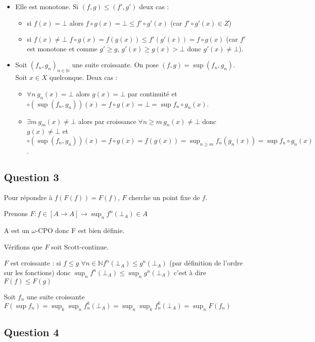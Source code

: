 \documentclass{article}
\newcommand{\N}{\mathbb{N}}
\newcommand{\oCPO}{$\omega$-CPO }
\begin{document}
\begin{itemize}
    \item Elle est monotone. Si $(f, g) \leq (f', g')$ deux cas :
    \begin{itemize}
        \item si $f(x) = \bot$ alors $f\circ g(x) = \bot \leq f'\circ g'(x)$ (car $f'\circ g'(x) \in Z$) 
        \item si $f(x) \neq \bot$ $f\circ g(x) = f(g(x)) \leq f'(g'(x)) = f\circ g(x)$ (car $f'$ est monotone et comme $g' \geq g$, $g'(x) \geq g(x) > \bot$ donc $g'(x) \neq \bot$).
    \end{itemize}
    \item Soit $(f_n, g_n)_{n \in \N}$ une suite croissante. On pose $(f, g) = \sup (f_n, g_n)$. Soit $x \in X$ quelconque. Deux cas :
    \begin{itemize}
        \item $\forall n \: g_n(x) = \bot$ alors $g(x) = \bot$ par continuité et $\circ(\sup (f_n, g_n))(x) = f\circ g(x) = \bot = \sup f_n\circ g_n(x)$.
        \item $\exists m \: g_m(x) \neq \bot$ alors par croissance $\forall n \geq m \: g_n(x) \neq \bot$ donc $g(x) \neq \bot$ et $\circ(\sup (f_n, g_n))(x) = f\circ g(x) = f(g(x)) = \sup_{n \geq m} f_n(g_n(x)) = \sup f_n\circ g_n(x)$.
    \end{itemize}
\end{itemize}

\subsection*{Question 3}

Pour répondre à $f(F(f))=F(f)$, $F$ cherche un point fixe de $f$. 

Prenons $F:f\in [A \rightarrow A] \rightarrow \sup_n f^n(\bot_A) \in A$

A est un \oCPO donc F est bien définie.

Vérifions que $F$ soit Scott-continue.

$F$ est croissante : si $f\leq g$ $\forall n \in \N f^n(\bot_A)\leq g^n(\bot_A)$ (par définition de l'ordre sur les fonctions) donc $\sup_n f^n(\bot_A) \leq \sup_n g^n(\bot_A)$ c'est à dire $F(f)\leq F(g)$

Soit $f_n$ une suite croissante $F(\sup f_n)=\sup_k \sup_n f_n^k(\bot_A)=\sup_n \sup_k f_n^k(\bot_A)=\sup_n F(f_n)$


\subsection*{Question 4}
\end{document}
